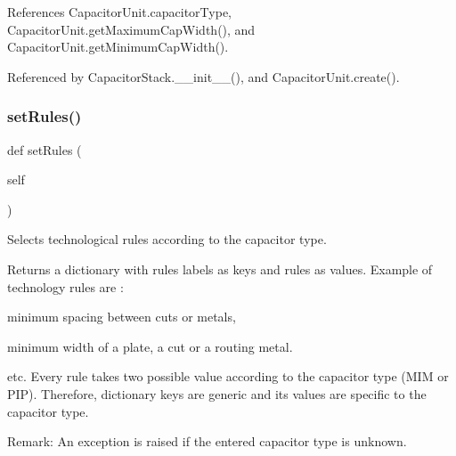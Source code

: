 References Capacitor\+Unit.\+capacitor\+Type, Capacitor\+Unit.\+get\+Maximum\+Cap\+Width(), and Capacitor\+Unit.\+get\+Minimum\+Cap\+Width().



Referenced by Capacitor\+Stack.\+\_\+\+\_\+init\+\_\+\+\_\+(), and Capacitor\+Unit.\+create().

\mbox{\label{classpython_1_1capacitorunit_1_1CapacitorUnit_a458149b1404a0e797668330beb75b640}} 
\subsubsection{\texorpdfstring{set\+Rules()}{setRules()}}
{\footnotesize\ttfamily def set\+Rules (\begin{DoxyParamCaption}\item[{}]{self }\end{DoxyParamCaption})}



Selects technological rules according to the capacitor type. 

\begin{DoxyReturn}{Returns}
a dictionary with rules labels as keys and rules as values. Example of technology rules are \+:
\begin{DoxyItemize}
\item minimum spacing between cuts or metals,
\item minimum width of a plate, a cut or a routing metal.
\item etc. Every rule takes two possible value according to the capacitor type (M\+IM or P\+IP). Therefore, dictionary keys are generic and its values are specific to the capacitor type. 
\end{DoxyItemize}
\end{DoxyReturn}
\begin{DoxyParagraph}{Remark\+: An exception is raised if the entered capacitor type is unknown. }

\end{DoxyParagraph}


